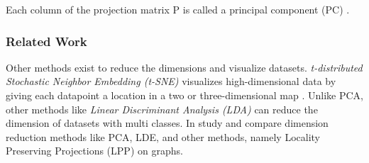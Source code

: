 \noindent Each column of the projection matrix P is called a principal component (PC) \cite{xu10701MachineLearning}. 


\subsubsection{Related Work}
\label{subsubsec:dimension-reduction-related-work}
Other methods exist to reduce the dimensions and visualize datasets. \emph{t-distributed Stochastic Neighbor Embedding (t-SNE)} visualizes high-dimensional data by giving each datapoint a location in a two or three-dimensional map \cite{vandermaaten08}. Unlike PCA, other methods like \emph{Linear Discriminant Analysis (LDA)} \cite{balakrishnamaLINEARDISCRIMINANTANALYSIS} can reduce the dimension of datasets with multi classes. In \cite{yanGraphEmbeddingExtensions2007} study and compare dimension reduction methods like PCA, LDE, and other methods, namely Locality Preserving Projections (LPP) on graphs.
